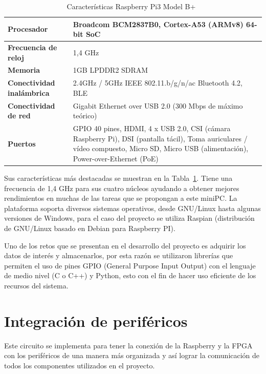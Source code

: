 \begin{table}[h] 
\begin{center}
\begin{tabular}{|p{4cm}|p{10cm}|}\hline
\textbf{Procesador} & Broadcom BCM2837B0, Cortex-A53 (ARMv8) 64-bit SoC\\ \hline
\textbf{Frecuencia de reloj}& 1,4 GHz\\ \hline
\textbf{Memoria}    & 1GB LPDDR2 SDRAM\\ \hline
\textbf{Conectividad inalámbrica} & 2.4GHz / 5GHz IEEE 802.11.b/g/n/ac Bluetooth 4.2, BLE\\ \hline
\textbf{Conectividad de red} & Gigabit Ethernet over USB 2.0 (300 Mbps de máximo teórico)\\ \hline 
\textbf{Puertos}    & GPIO 40 pines, HDMI, 4 x USB 2.0, CSI (cámara Raspberry Pi), DSI (pantalla tácil), Toma auriculares / vídeo compuesto, Micro SD, Micro USB (alimentación), Power-over-Ethernet (PoE)\\ \hline
\end{tabular}
\caption{Características Raspberry Pi3 Model B+~\citep{Pasor2018}}
\label{tabla2}
\end{center}
\end{table}

Sus características más destacadas se muestran en la Tabla~\ref{tabla2}. Tiene una frecuencia de 1,4 GHz para sus cuatro núcleos  ayudando a obtener mejores rendimientos en muchas de las tareas que se propongan a este miniPC. 
La plataforma soporta diversos sistemas operativos, desde GNU/Linux hasta algunas versiones de Windows, para el caso del proyecto se utiliza Raspian (distribución de GNU/Linux basado en Debian para Raspberry PI).

Uno de los retos que se presentan en el desarrollo del proyecto es adquirir los datos de interés y almacenarlos, por esta razón se utilizaron librerías que permiten el uso de pines GPIO (General Purpose Input Output) con el lenguaje de medio nivel (C o C++) y Python, esto con el fin de hacer uso eficiente de los recursos del sistema.


\section{Integración de periféricos}
Este circuito se implementa para tener la conexión de la Raspberry y la FPGA con los periféricos de una manera más organizada y así lograr la comunicación de todos los componentes utilizados en el proyecto.

